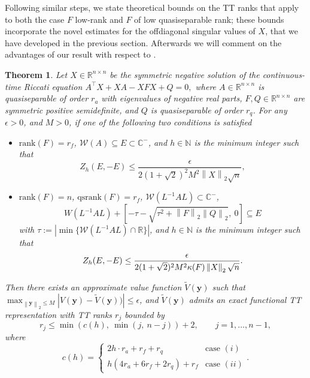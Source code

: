 \documentclass[a4paper,10pt]{article}
\def\rank{\mathrm{rank}}
\def\qsrank{\mathrm{qsrank}}
\newcommand{\norm}[1]{\left\lVert#1\right\rVert}
\newtheorem{theorem}[definition]{Theorem}
\newcommand{\upd}[1]{{\color{black}#1}} %
\begin{document}
Following similar steps, we  state theoretical bounds on the TT ranks that apply to both the case $F$ low-rank and $F$ of low quasiseparable rank; these bounds incorporate the novel estimates for the offdiagonal singular values of $X$, that we have developed in the previous section. Afterwards we will comment on the advantages of our result with respect to \cite[Theorem 3.1]{dolgov21}. 
\begin{theorem}\label{thm:ttranks}
Let $X\in\mathbb R^{n\times n}$ be  the symmetric negative solution of the continuous-time Riccati equation 
$
A^\top X+XA-XFX+Q=0,
$	where $A\in\mathbb R^{n\times n}$ is  quasiseparable of order $r_a$ with eigenvalues of negative real parts, $F,Q\in\mathbb R^{n\times n}$ are symmetric positive semidefinite,  and $Q$ is quasiseparable of order $r_q$. For any $\epsilon>0$, and $M>0$, if one of the following two conditions is satisfied
\begin{itemize}
	\item[$(i)$] $\rank(F) = r_f$, $\mathcal W(A)\subseteq E\subset \mathbb C^{-}$,	and $h\in\mathbb N$ is the minimum integer such that
	$$
	Z_h(E,-E)\le \frac{\epsilon}{2(1+\sqrt 2)^2M^2\norm{X}_2\sqrt{n}},
	$$
	\item[$(ii)$] $\rank(F)=n$,  $\qsrank(F)=r_f$,  $\mathcal W(L^{-1}AL)\subset \mathbb C^{-}$, $$W(L^{-1}AL)+ \left[-\tau -\sqrt{\tau^2+\norm{F}_2\norm{Q}_2},\ 0\right]\subseteq E$$ with $\tau:= |\min\{\mathcal W(L^{-1}AL)\cap \mathbb R\}|$,	and $h\in\mathbb N$ is the minimum integer such that
	$$
	Z_h(E,-E)\le \frac{\epsilon}{2(1+\sqrt 2)^2M^2\kappa(F)\norm{X}_2\sqrt{n}}\upd{.}
	$$
\end{itemize}
 \upd{Then} there exists an approximate value function $\widetilde V(\mathbf y)$ such that  $\max_{\norm{\mathbf y}_2\le M}|V(\mathbf y)-\widetilde V(\mathbf y))|\le \epsilon$, and $\widetilde V(\mathbf y)$ admits an exact functional TT representation with TT ranks $r_j$ bounded by
\begin{equation*}\label{eq:ttrank-bound}
r_j\le \min\left(c(h),\ \min(j,\ n-j)\right) +2,\qquad j=1,\dots, n-1,	
 	\end{equation*}
where $$
c(h)=
\begin{cases}
2h\cdot  r_a+r_f+r_q	&\text{case $(i)$}\\
h(4r_a+6r_f +2r_q) +r_f	&\text{case $(ii)$}
\end{cases}.
$$
\end{theorem}
\end{document}
